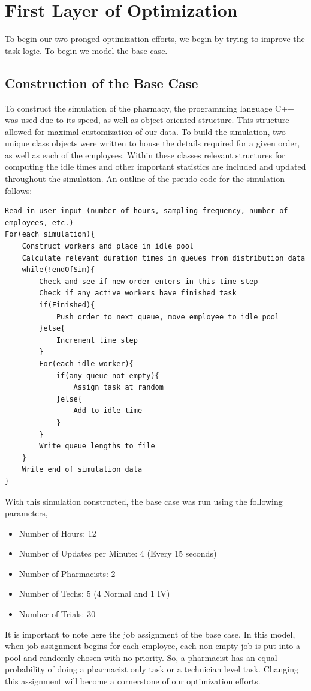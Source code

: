 \documentclass[10pt]{report}            %
\begin{document}
\section*{First Layer of Optimization}
To begin our two pronged optimization efforts, we begin by trying to improve the task logic. To begin we model the base case.
\subsection*{Construction of the Base Case}
To construct the simulation of the pharmacy, the programming language C++ was used due to its speed, as well as object oriented structure. This structure allowed for maximal customization of our data. To build the simulation, two unique class objects were written to house the details required for a given order, as well as each of the employees. Within these classes relevant structures for computing the idle times and other important statistics are included and updated throughout the simulation. An outline of the pseudo-code for the simulation follows:
\begin{verbatim}
Read in user input (number of hours, sampling frequency, number of employees, etc.)
For(each simulation){
    Construct workers and place in idle pool
    Calculate relevant duration times in queues from distribution data
    while(!endOfSim){
        Check and see if new order enters in this time step
        Check if any active workers have finished task
        if(Finished){
            Push order to next queue, move employee to idle pool
        }else{
            Increment time step
        }
        For(each idle worker){
            if(any queue not empty){
                Assign task at random                   
            }else{
                Add to idle time
            }
        }
        Write queue lengths to file
    }
    Write end of simulation data
}
\end{verbatim}
With this simulation constructed, the base case was run using the following parameters,
\begin{itemize}
\item Number of Hours: 12
\item Number of Updates per Minute: 4 (Every 15 seconds)
\item Number of Pharmacists: 2
\item Number of Techs: 5 (4 Normal and 1 IV)
\item Number of Trials: 30
\end{itemize}
It is important to note here the job assignment of the base case. In this model, when job assignment begins for each employee, each non-empty job is put into a pool and randomly chosen with no priority. So, a pharmacist has an equal probability of doing a pharmacist only task or a technician level task. Changing this assignment will become a cornerstone of our optimization efforts.
\end{document}
